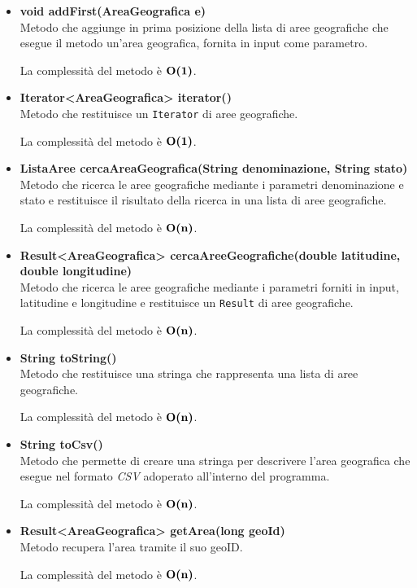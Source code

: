 \documentclass[a4paper, 12pt]{scrreprt}
\begin{document}
\begin{itemize}
				La complessit\`a del metodo \`e $\bigO\textbf{(n)}$.

				\item \textbf{void addFirst(AreaGeografica e)}
				\\Metodo che aggiunge in prima posizione della lista di aree geografiche che esegue il metodo un'area geografica, fornita in input come parametro.

				La complessit\`a del metodo \`e $\mathbf{O}\textbf{(1)}$.

				\item \textbf{Iterator<AreaGeografica> iterator()}
				\\Metodo che restituisce un \verb!Iterator! di aree geografiche.

				La complessit\`a del metodo \`e $\mathbf{O}\textbf{(1)}$.

				\item \textbf{ListaAree cercaAreaGeografica(String denominazione, String stato)}
				\\Metodo che ricerca le aree geografiche mediante i parametri denominazione e stato e restituisce il risultato della ricerca in una lista di aree geografiche.

				La complessit\`a del metodo \`e $\bigO\textbf{(n)}$.

				\item \textbf{Result<AreaGeografica> cercaAreeGeografiche(double latitudine, double longitudine)}
				\\Metodo che ricerca le aree geografiche mediante i parametri forniti in input, latitudine e longitudine e restituisce un \verb!Result! di aree geografiche.

				La complessit\`a del metodo \`e $\bigO\textbf{(n)}$.

				\item \textbf{String toString()}
				\\Metodo che restituisce una stringa che rappresenta una lista di aree geografiche.

				La complessit\`a del metodo \`e $\bigO\textbf{(n)}$.
				\pagebreak
				\item \textbf{String toCsv()}
				\\Metodo che permette di creare una stringa per descrivere l'area geografica che esegue nel formato \textsl{CSV} adoperato all'interno del programma.

				La complessit\`a del metodo \`e $\bigO\textbf{(n)}$.


				\item \textbf{Result<AreaGeografica> getArea(long geoId)}
				\\Metodo recupera l'area tramite il suo geoID.

				La complessit\`a del metodo \`e $\bigO\textbf{(n)}$.

			\end{itemize}
\end{document}

